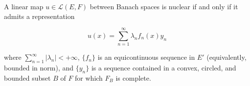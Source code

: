A linear map $u \in \mathcal{L}(E, F)$ between Banach spaces is nuclear if and only if it admits a representation

$$u(x) = \sum_{n=1}^{\infty} \lambda_n f_n(x) y_n$$

where $\sum_{n=1}^{\infty} |\lambda_n| < +\infty$, $\{f_n\}$ is an equicontinuous sequence in $E'$ (equivalently, bounded in norm), and $\{y_n\}$ is a sequence contained in a convex, circled, and bounded subset $B$ of $F$ for which $F_B$ is complete.

